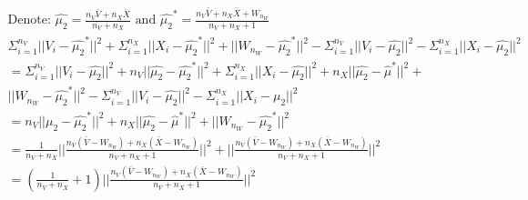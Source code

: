 \documentclass{article}\usepackage[]{graphicx}\usepackage[]{color}
\begin{document}
\begin{align*}
\text{Denote: } \hat{\mu_2} = \frac{n_V \bar{V} + n_X \bar{X}}{n_V + n_X} \text{ and } \hat{\mu_2}^* = \frac{n_V \bar{V} + n_X \bar{X} + W_{n_W}}{n_V + n_X + 1} \\
\Sigma_{i=1}^{n_V}||V_i - \hat{\mu_2}^*||^2 + \Sigma_{i=1}^{n_X}||X_i - \hat{\mu_2}^*||^2 + ||W_{n_W} - \hat{\mu_2}^*||^2 - \Sigma_{i=1}^{n_V}||V_i - \hat{\mu_2}||^2 - \Sigma_{i=1}^{n_X}||X_i - \hat{\mu_2}||^2 \\
= \Sigma_{i=1}^{n_V}||V_i - \hat{\mu_2}||^2 + n_V||\hat{\mu_2} - \hat{\mu_2}^*||^2 + \Sigma_{i=1}^{n_X}||X_i - \hat{\mu_2}||^2 +  n_X||\hat{\mu_2} - \hat{\mu}^*||^2 +  \\
||W_{n_W} - \hat{\mu_2}^*||^2 - \Sigma_{i=1}^{n_V}||V_i - \hat{\mu_2}||^2 - \Sigma_{i=1}^{n_X}||X_i - \hat{\mu_2}||^2\\
=  n_V||\hat{\mu_2} - \hat{\mu_2}^*||^2 + n_X||\hat{\mu_2} - \hat{\mu}^*||^2 + ||W_{n_W} - \hat{\mu_2}^*||^2\\
= \frac{1}{n_V + n_X}||\frac{n_V(\bar{V} - W_{n_W}) + n_X(\bar{X} - W_{n_W})}{n_V + n_X + 1}||^2 + ||\frac{n_V(\bar{V} - W_{n_W}) + n_X(\bar{X} - W_{n_W})}{n_V + n_X + 1}||^2\\
= (\frac{1}{n_V + n_X} + 1)||\frac{n_V(\bar{V} - W_{n_W}) + n_X(\bar{X} - W_{n_W})}{n_V + n_X + 1}||^2
\end{align*}
\end{document}
